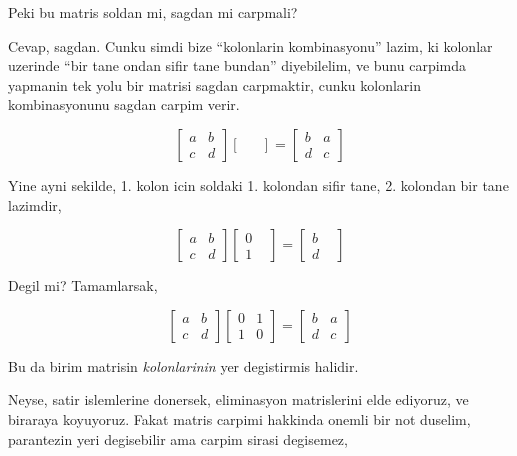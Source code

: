 \documentclass[12pt,fleqn]{article}\usepackage{../common}
\begin{document}
Peki bu matris soldan mi, sagdan mi carpmali? 

Cevap, sagdan. Cunku simdi bize ``kolonlarin kombinasyonu'' lazim, ki
kolonlar uzerinde ``bir tane ondan sifir tane bundan'' diyebilelim, ve bunu
carpimda yapmanin tek yolu bir matrisi sagdan carpmaktir, cunku kolonlarin
kombinasyonunu sagdan carpim verir. 

$$ 
\left[\begin{array}{rr}
a & b \\
c & d
\end{array}\right]
\left[\begin{array}{rr}
 &  \\
 & 
\end{array}\right]
=
\left[\begin{array}{rr}
b & a \\
d & c
\end{array}\right]
 $$

Yine ayni sekilde, 1. kolon icin soldaki 1. kolondan sifir tane,
2. kolondan bir tane lazimdir, 

$$ 
\left[\begin{array}{rr}
a & b \\
c & d
\end{array}\right]
\left[\begin{array}{rr}
0 &  \\
1 & 
\end{array}\right]
=
\left[\begin{array}{rr}
b &  \\
d & 
\end{array}\right]
 $$

Degil mi? Tamamlarsak,

$$ 
\left[\begin{array}{rr}
a & b \\
c & d
\end{array}\right]
\left[\begin{array}{rr}
0 & 1 \\
1 & 0
\end{array}\right]
=
\left[\begin{array}{rr}
b & a \\
d & c
\end{array}\right]
 $$

Bu da birim matrisin {\em kolonlarinin} yer degistirmis halidir. 

Neyse, satir islemlerine donersek, eliminasyon matrislerini elde ediyoruz,
ve biraraya koyuyoruz. Fakat matris carpimi hakkinda onemli bir not
duselim, parantezin yeri degisebilir ama carpim sirasi degisemez,
\end{document}

